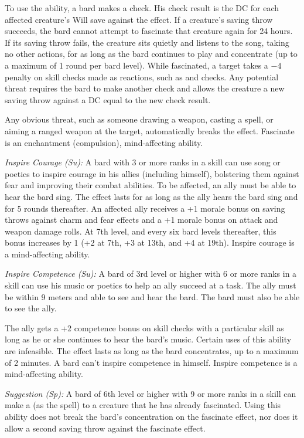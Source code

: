 To use the ability, a bard makes a  check. His check result is the DC for each affected creature's Will save against the effect. If a creature's saving throw succeeds, the bard cannot attempt to fascinate that creature again for 24 hours. If its saving throw fails, the creature sits quietly and listens to the song, taking no other actions, for as long as the bard continues to play and concentrate (up to a maximum of 1 round per bard level). While fascinated, a target takes a $-4$ penalty on skill checks made as reactions, such as  and  checks. Any potential threat requires the bard to make another  check and allows the creature a new saving throw against a DC equal to the new  check result.

Any obvious threat, such as someone drawing a weapon, casting a spell, or aiming a ranged weapon at the target, automatically breaks the effect. Fascinate is an enchantment (compulsion), mind-affecting ability.

\textit{Inspire Courage (Su):} A bard with 3 or more ranks in a  skill can use song or poetics to inspire courage in his allies (including himself), bolstering them against fear and improving their combat abilities. To be affected, an ally must be able to hear the bard sing. The effect lasts for as long as the ally hears the bard sing and for 5 rounds thereafter. An affected ally receives a +1 morale bonus on saving throws against charm and fear effects and a +1 morale bonus on attack and weapon damage rolls. At 7th level, and every six bard levels thereafter, this bonus increases by 1 (+2 at 7th, +3 at 13th, and +4 at 19th). Inspire courage is a mind-affecting ability.

\textit{Inspire Competence (Su):} A bard of 3rd level or higher with 6 or more ranks in a  skill can use his music or poetics to help an ally succeed at a task. The ally must be within 9 meters and able to see and hear the bard. The bard must also be able to see the ally.

The ally gets a +2 competence bonus on skill checks with a particular skill as long as he or she continues to hear the bard's music. Certain uses of this ability are infeasible. The effect lasts as long as the bard concentrates, up to a maximum of 2 minutes. A bard can't inspire competence in himself. Inspire competence is a mind-affecting ability.

\textit{Suggestion (Sp):} A bard of 6th level or higher with 9 or more ranks in a  skill can make a  (as the spell) to a creature that he has already fascinated. Using this ability does not break the bard's concentration on the fascinate effect, nor does it allow a second saving throw against the fascinate effect.

